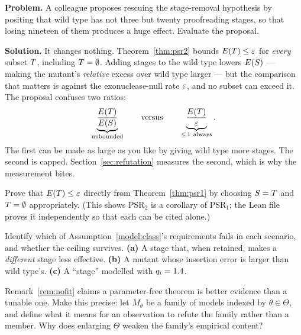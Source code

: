 \begin{worked}
\textbf{Problem.} A colleague proposes rescuing the stage-removal hypothesis by
positing that wild type has not three but twenty proofreading stages, so that
losing nineteen of them produces a huge effect. Evaluate the proposal.

\textbf{Solution.} It changes nothing. Theorem~\ref{thm:psr2} bounds
$E(T) \le \varepsilon$ for \emph{every} subset $T$, including $T = \emptyset$.
Adding stages to the wild type lowers $E(S)$ --- making the mutant's
\emph{relative} excess over wild type larger --- but the comparison that matters
is against the exonuclease-null rate $\varepsilon$, and no subset can exceed it.
The proposal confuses two ratios:
\[
  \underbrace{\frac{E(T)}{E(S)}}_{\text{unbounded}}
  \qquad\text{versus}\qquad
  \underbrace{\frac{E(T)}{\varepsilon}}_{\le\,1\ \text{always}} .
\]
The first can be made as large as you like by giving wild type more stages. The
second is capped. Section~\ref{sec:refutation} measures the second, which is why
the measurement bites.
\end{worked}

\begin{exercise}
Prove that $E(T) \le \varepsilon$ directly from Theorem~\ref{thm:psr1} by
choosing $S = T$ and $T = \emptyset$ appropriately. (This shows
PSR$_2$ is a corollary of PSR$_1$; the Lean file proves it independently so that
each can be cited alone.)
\end{exercise}

\begin{exercise}
Identify which of Assumption~\ref{model:class}'s requirements fails in each
scenario, and whether the ceiling survives.
\textbf{(a)} A stage that, when retained, makes a \emph{different} stage less
effective. \textbf{(b)} A mutant whose insertion error is larger than wild type's.
\textbf{(c)} A ``stage'' modelled with $q_i = 1.4$.
\end{exercise}

\begin{exercise}
Remark~\ref{rem:nofit} claims a parameter-free theorem is better evidence than a
tunable one. Make this precise: let $M_\theta$ be a family of models indexed by
$\theta \in \Theta$, and define what it means for an observation to refute the
family rather than a member. Why does enlarging $\Theta$ weaken the family's
empirical content?
\end{exercise}

